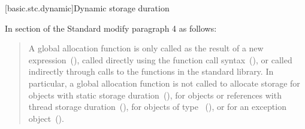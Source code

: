 [basic.stc.dynamic]{Dynamic storage duration}


In section  of the \Cpp Standard 
modify paragraph 4 as follows:

\begin{quote}
	\setcounter{Paras}{3}
	\pnum
	A global allocation function is only called as the result of a new
	expression~(),  called directly using the function call
	syntax~(), 
	or called indirectly through calls to the
	functions in the \Cpp standard library. \enternote In particular, a
	global allocation function is not called to allocate storage for objects
	with static storage duration~(), for objects or references
	with thread storage duration~(), for objects of
	type ~(), or for an
	exception object~().
	\exitnote
\end{quote}

